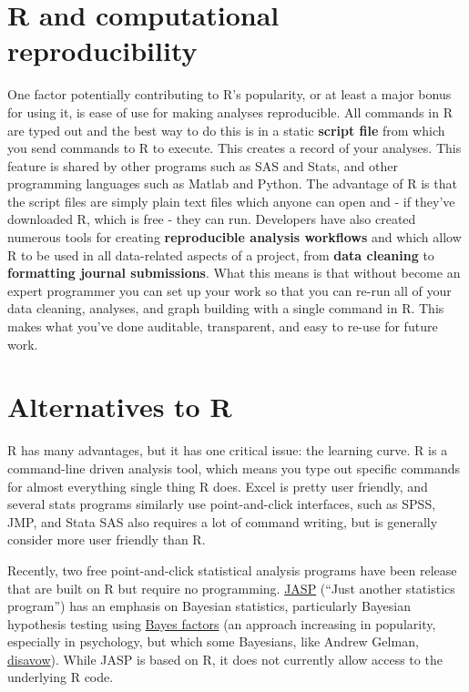 \documentclass[]{book}
\theoremstyle{definition}
\theoremstyle{definition}
\theoremstyle{definition}
\theoremstyle{remark}
\begin{document}
\section{R and computational
reproducibility}\label{r-and-computational-reproducibility}

One factor potentially contributing to R's popularity, or at least a
major bonus for using it, is ease of use for making analyses
reproducible. All commands in R are typed out and the best way to do
this is in a static \textbf{script file} from which you send commands to
R to execute. This creates a record of your analyses. This feature is
shared by other programs such as SAS and Stats, and other programming
languages such as Matlab and Python. The advantage of R is that the
script files are simply plain text files which anyone can open and - if
they've downloaded R, which is free - they can run. Developers have also
created numerous tools for creating \textbf{reproducible analysis
workflows} and which allow R to be used in all data-related aspects of a
project, from \textbf{data cleaning} to \textbf{formatting journal
submissions}. What this means is that without become an expert
programmer you can set up your work so that you can re-run all of your
data cleaning, analyses, and graph building with a single command in R.
This makes what you've done auditable, transparent, and easy to re-use
for future work.

\section{Alternatives to R}\label{alternatives-to-r}

R has many advantages, but it has one critical issue: the learning
curve. R is a command-line driven analysis tool, which means you type
out specific commands for almost everything single thing R does. Excel
is pretty user friendly, and several stats programs similarly use
point-and-click interfaces, such as SPSS, JMP, and Stata SAS also
requires a lot of command writing, but is generally consider more user
friendly than R.

Recently, two free point-and-click statistical analysis programs have
been release that are built on R but require no programming.
\href{https://jasp-stats.org/}{JASP} (``Just another statistics
program'') has an emphasis on Bayesian statistics, particularly Bayesian
hypothesis testing using
\href{https://en.wikipedia.org/wiki/Bayes_factor}{Bayes factors} (an
approach increasing in popularity, especially in psychology, but which
some Bayesians, like Andrew Gelman,
\href{http://andrewgelman.com/2011/04/02/so-called_bayes/}{disavow}).
While JASP is based on R, it does not currently allow access to the
underlying R code.
\end{document}
